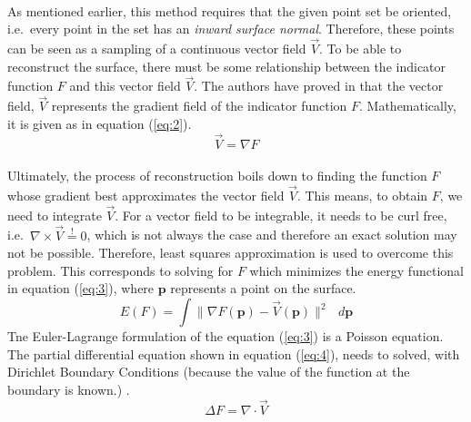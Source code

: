 \documentclass[12pt,a4paper]{article}
\begin{document}
\paragraph{}As mentioned earlier, this method requires that the given point set be oriented, i.e.\ every point in the set has an \textit{inward surface normal}. Therefore, these points can be seen as a sampling of a continuous vector field $\vec{V}$. To be able to reconstruct the surface, there must be some relationship between the indicator function $F$ and this vector field $\vec{V}$. The authors have proved in \cite{Poisson} that the vector field, $\vec{V}$ represents the gradient field of the indicator function $F$. Mathematically, it is given as in equation (\ref{eq:2}).
\begin{equation}
\label{eq:2}
\vec{V} = \nabla F
\end{equation}
\paragraph{}Ultimately, the process of reconstruction boils down to finding the function $F$ whose gradient best approximates the vector field $\vec{V}$. This means, to obtain $F$, we need to integrate $\vec{V}$. For a vector field to be integrable, it needs to be curl free, i.e.\ $ \nabla \times \vec{V} \overset{!}{=} 0 $, which is not always the case and therefore an exact solution may not be possible. Therefore, least squares approximation is used to overcome this problem. This corresponds to solving for $F$ which minimizes the energy functional in equation (\ref{eq:3}), where $\mathbf{p}$ represents a point on the surface.
\begin{equation}
\label{eq:3}
E(F) = \int \| \nabla F(\mathbf{p}) - \vec{V}(\mathbf{p}) \|^2 \mbox{ }d\mathbf{p}
\end{equation}
Tne Euler-Lagrange formulation of the equation (\ref{eq:3}) is a Poisson equation. The partial differential equation shown in equation (\ref{eq:4}), needs to solved, with Dirichlet Boundary Conditions (because the value of the function at the boundary is known.) . 
\begin{equation}
\label{eq:4}
\Delta F= \nabla \cdot \vec{V}
\end{equation}
\end{document}
